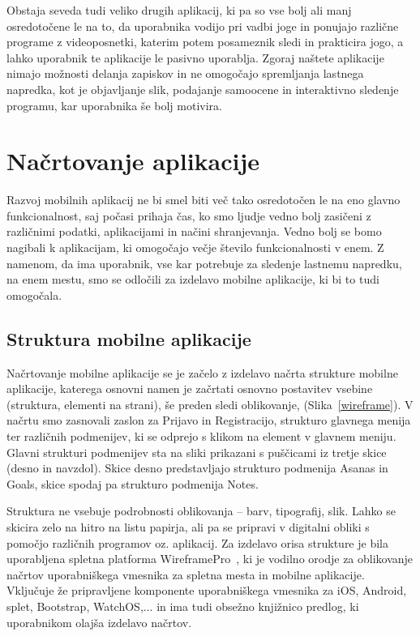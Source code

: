 \documentclass[a4paper, 12pt]{book}
\begin{document}
Obstaja seveda tudi veliko drugih aplikacij, ki pa so vse bolj ali manj osredotočene le na to, da uporabnika vodijo pri vadbi joge in ponujajo različne programe z videoposnetki, katerim potem posameznik sledi in prakticira jogo, a lahko uporabnik te aplikacije le pasivno uporablja. Zgoraj naštete aplikacije nimajo možnosti delanja zapiskov in ne omogočajo spremljanja lastnega napredka, kot je objavljanje slik, podajanje samoocene in interaktivno sledenje programu, kar uporabnika še bolj motivira.

\chapter{Načrtovanje aplikacije}
\label{ch1}

Razvoj mobilnih aplikacij ne bi smel biti več tako osredotočen le na eno glavno funkcionalnost, saj počasi prihaja čas, ko smo ljudje vedno bolj zasičeni z različnimi podatki, aplikacijami in načini shranjevanja. Vedno bolj se bomo nagibali k aplikacijam, ki omogočajo večje število funkcionalnosti v enem. Z namenom, da ima uporabnik, vse kar potrebuje za sledenje lastnemu napredku, na enem mestu, smo se odločili za izdelavo mobilne aplikacije, ki bi to tudi omogočala.

\section{Struktura mobilne aplikacije}
Načrtovanje mobilne aplikacije se je začelo z izdelavo načrta strukture mobilne aplikacije,  katerega osnovni namen je začrtati osnovno postavitev vsebine (struktura, elementi na strani), še preden sledi oblikovanje, (Slika~\ref{wireframe}). V načrtu smo zasnovali zaslon za Prijavo in Registracijo, strukturo glavnega menija ter različnih podmenijev, ki se odprejo s klikom na element v glavnem meniju. Glavni strukturi podmenijev sta na sliki prikazani s puščicami iz tretje skice (desno in navzdol). Skice desno predstavljajo strukturo podmenija Asanas in Goals, skice spodaj pa strukturo podmenija Notes.

Struktura ne vsebuje podrobnosti oblikovanja – barv, tipografij, slik. Lahko se skicira zelo na hitro na listu papirja, ali pa se pripravi v digitalni obliki s pomočjo različnih programov oz. aplikacij. Za izdelavo orisa strukture je bila uporabljena spletna platforma WireframePro~\cite{WireframePro}, ki je vodilno orodje za oblikovanje načrtov uporabniškega vmesnika za spletna mesta in mobilne aplikacije. Vključuje že pripravljene komponente uporabniškega vmesnika za iOS, Android, splet, Bootstrap, WatchOS,... in ima tudi obsežno knjižnico predlog, ki uporabnikom olajša izdelavo načrtov.\\
\end{document}
